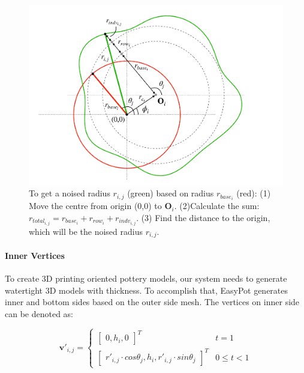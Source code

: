 \documentclass{svjour3}                     %
\begin{document}
\begin{figure}
\includegraphics[width=\textwidth]{fig5.pdf}
\caption{To get a noised radius $r_{i,j}$ (green) based on radius $r_{base_{i}}$ (red): (1) Move the centre from origin (0,0) to $\mathbf{O}_{i}$. (2)Calculate the sum: $r_{total_{i,j}} = r_{base_{i}} + r_{row_{i}} + r_{indv_{i,j}}$. (3) Find the distance to the origin, which will be the noised radius $r_{i,j}$.}
\label{fig:noise}
\end{figure}

\paragraph{Inner Vertices} To create 3D printing oriented pottery models, our system needs to generate watertight 3D models with thickness.
To accomplish that, EasyPot generates inner and bottom sides based on the outer side mesh. The vertices on inner side can be denoted as:

\begin{equation}
\label{eqn:v'}
\mathbf{v'}_{i,j} 
= \begin{cases}
\begin{bmatrix}
0,h_{i},0
\end{bmatrix}^T & t=1
\\
\begin{bmatrix}
r'_{i,j} \cdot cos \theta_{j},
h_{i},
r'_{i,j} \cdot sin \theta_{j}
\end{bmatrix}^T & 0 \le t<1
\end{cases}
\end{equation}
\end{document}
